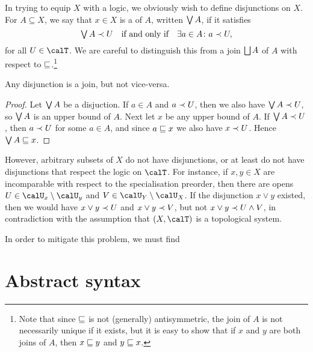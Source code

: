 \documentclass[a4paper, 11pt, article, danish, oneside]{memoir}
\newcommand{\meet}{\land}
\newcommand{\join}{\lor}
\DeclareMathOperator*{\smallbigvee}{\textstyle\bigvee}
\DeclareMathOperator*{\bigjoin}{\mathchoice
    {\smallbigvee}%
    {\bigvee}%
    {\bigvee}%
    {\bigvee}%
}
\DeclareMathOperator*{\smallbigsqcup}{\textstyle\bigsqcup}
\DeclareMathOperator*{\bigdjoin}{\mathchoice
    {\smallbigsqcup}%
    {\bigsqcup}%
    {\bigsqcup}%
    {\bigsqcup}%
}
\newcommand{\newpar}{\paragraph{}}
\begin{document}
In trying to equip $X$ with a logic, we obviously wish to define disjunctions on $X$. For $A \subseteq X$, we say that $x \in X$ is a  of $A$, written $\bigjoin A$, if it satisfies
%
\begin{equation*}
    \bigjoin A \inpoint U
        \quad \text{if and only if} \quad
        \exists a \in A \colon a \inpoint U,
\end{equation*}
%
for all $U \in \calT$. We are careful to distinguish this from a join $\bigdjoin A$ of $A$ with respect to $\sqsubseteq$.\footnote{Note that since $\sqsubseteq$ is not (generally) antisymmetric, the join of $A$ is not necessarily unique if it exists, but it is easy to show that if $x$ and $y$ are both joins of $A$, then $x \sqsubseteq y$ and $y \sqsubseteq x$.}

\begin{proposition}
    Any disjunction is a join, but not vice-versa.
\end{proposition}

\begin{proof}
    Let $\bigjoin A$ be a disjuction. If $a \in A$ and $a \prec U$, then we also have $\bigjoin A \inpoint U$, so $\bigjoin A$ is an upper bound of $A$. Next let $x$ be any upper bound of $A$. If $\bigjoin A \inpoint U$, then $a \prec U$ for some $a \in A$, and since $a \sqsubseteq x$ we also have $x \prec U$. Hence $\bigjoin A \specs x$.
\end{proof}

However, arbitrary subsets of $X$ do not have disjunctions, or at least do not have disjunctions that respect the logic on $\calT$. For instance, if $x,y \in X$ are incomparable with respect to the specialisation preorder, then there are opens $U \in \opens{x} \setminus \opens{y}$ and $V \in \opens{Y} \setminus \opens{X}$. If the disjunction $x \join y$ existed, then we would have $x \join y \inpoint U$ and $x \join y \inpoint V$, but not $x \join y \inpoint U \meet V$, in contradiction with the assumption that $(X,\calT)$ is a topological system.

In order to mitigate this problem, we must find 



\section{Abstract syntax}

\newpar
\end{document}
